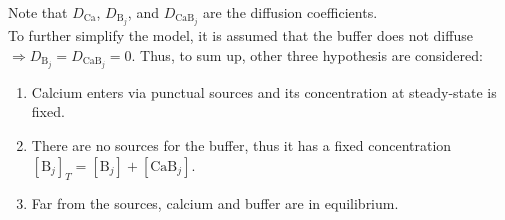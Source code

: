 Note that \(D_{\text{Ca}}\), \(D_{\text{B}_{j}}\), and \(D_{\text{CaB}_{j}}\) are the
diffusion coefficients.\\
To further simplify the model, it is assumed that the buffer does not diffuse
\(\Rightarrow{D_{\text{B}_{j}}=D_{\text{CaB}_{j}}=0}\). Thus, to sum up,
other three hypothesis are considered:
\begin{enumerate}
    \item Calcium enters via punctual sources and its concentration at steady-state is fixed.
    \item There are no sources for the buffer, thus it has a fixed concentration
          \([\text{B}_{j}]_{T}=[\text{B}_{j}]+[\text{CaB}_{j}]\).
    \item Far from the sources, calcium and buffer are in equilibrium.
\end{enumerate}
